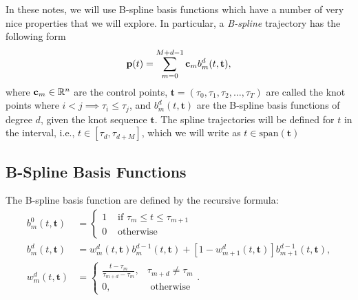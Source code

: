 In these notes, we will use B-spline basis functions which have a number of very nice properties that we will explore.  In particular, a {\em B-spline} trajectory has the following form
\begin{equation}\label{eq:general-b-spline}
\mathbf{p}(t) = \sum_{m=0}^{M+d-1} \cbf_m b_m^d(t, \mathbf{t}),
\end{equation}
where $\mathbf{c}_m\in\mathbb{R}^n$ are the control points,  $\mathbf{t}=(\tau_0, \tau_1, \tau_2, \dots, \tau_T)$ are called the knot points where $i<j \implies \tau_i\leq \tau_j$, and $b_m^d(t, \mathbf{t})$ are the B-spline basis functions of degree $d$, given the knot sequence $\mathbf{t}$. The spline trajectories will be defined for $t$ in the interval, i.e., $t\in[\tau_d, \tau_{d+M}]$, which we will write as $t\in\text{span}(\mathbf{t})$


\subsection{B-Spline Basis Functions}
\label{sec:b-spline-basis-functions}

The B-spline basis function are defined by the recursive formula:
\begin{align}
b_m^0(t, \mathbf{t}) &= \begin{cases} 1 & \text{~if~} \tau_m \leq t \leq \tau_{m+1} \\ 
 									 0 & \text{~otherwise} 
 					   \end{cases} 
	\label{eq:spline_basis_definition_0}\\	
b_m^d(t, \mathbf{t}) &= w_m^d(t, \mathbf{t}) b_m^{d-1}(t, \mathbf{t}) + \left[1-w_{m+1}^d(t, \mathbf{t})\right] b_{m+1}^{d-1}(t,  \mathbf{t}),
	\label{eq:spline_basis_definition_k} \\
w_m^d(t, \mathbf{t}) &= \begin{cases}
                      		\frac{t-\tau_m}{\tau_{m+d}-\tau_m}, & \tau_{m+d}\neq \tau_m \\
                      		0, & \text{~otherwise} 
                        \end{cases}.
     \label{eq:spline_basis_definition_w}
\end{align}


